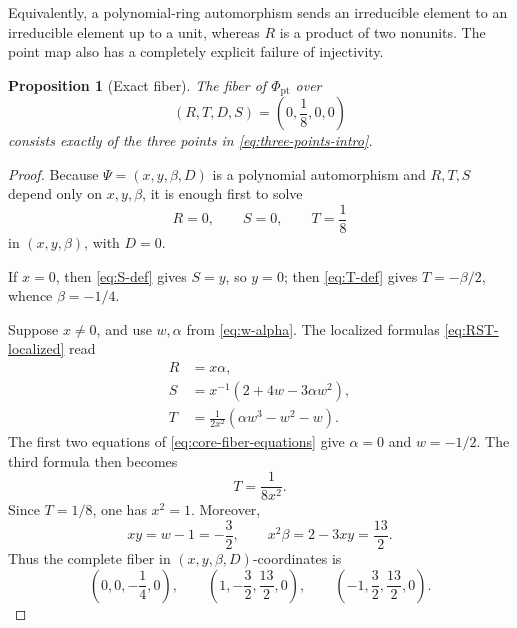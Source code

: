 \documentclass[11pt]{article}
\newtheorem{proposition}[theorem]{Proposition}
\theoremstyle{remark}
\begin{document}
Equivalently, a polynomial-ring automorphism sends an irreducible element to
an irreducible element up to a unit, whereas \(R\) is a product of two
nonunits.  The point map also has a completely explicit failure of
injectivity.

\begin{proposition}[Exact fiber]\label{prop:exact-fiber}
The fiber of \(\Phi_{\mathrm{pt}}\) over
\begin{equation}\label{eq:fiber-target}
  (R,T,D,S)=\left(0,\frac18,0,0\right)
\end{equation}
consists exactly of the three points in \eqref{eq:three-points-intro}.
\end{proposition}

\begin{proof}
Because \(\Psi=(x,y,\beta,D)\) is a polynomial automorphism and
\(R,T,S\) depend only on \(x,y,\beta\), it is enough first to solve
\begin{equation}\label{eq:core-fiber-equations}
  R=0,
  \qquad
  S=0,
  \qquad
  T=\frac18
\end{equation}
in \((x,y,\beta)\), with \(D=0\).

If \(x=0\), then \eqref{eq:S-def} gives \(S=y\), so \(y=0\); then
\eqref{eq:T-def} gives \(T=-\beta/2\), whence \(\beta=-1/4\).

Suppose \(x\neq0\), and use \(w,\alpha\) from \eqref{eq:w-alpha}.  The
localized formulas \eqref{eq:RST-localized} read
\begin{equation}\label{eq:localized-fiber-formulas}
\begin{split}
  R&=x\alpha,\\
  S&=x^{-1}(2+4w-3\alpha w^2),\\
  T&=\frac1{2x^2}(\alpha w^3-w^2-w).
\end{split}
\end{equation}
The first two equations of \eqref{eq:core-fiber-equations} give
\(\alpha=0\) and \(w=-1/2\).  The third formula then becomes
\[
  T=\frac1{8x^2}.
\]
Since \(T=1/8\), one has \(x^2=1\).  Moreover,
\[
  xy=w-1=-\frac32,
  \qquad
  x^2\beta=2-3xy=\frac{13}{2}.
\]
Thus the complete fiber in \((x,y,\beta,D)\)-coordinates is
\begin{equation}\label{eq:core-three-point-fiber}
  \left(0,0,-\frac14,0\right),
  \qquad
  \left(1,-\frac32,\frac{13}{2},0\right),
  \qquad
  \left(-1,\frac32,\frac{13}{2},0\right).
\end{equation}


\end{proof}
\end{document}
